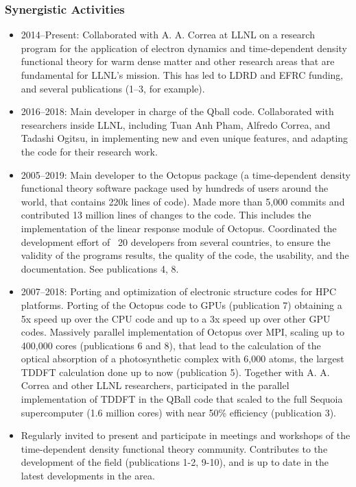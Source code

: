 \subsubsection*{Synergistic Activities}

\begin{itemize}
    \item 2014–Present: Collaborated with A. A. Correa at LLNL on a research program for the application of electron dynamics and time-dependent density functional theory for warm dense matter and other research areas that are fundamental for LLNL’s mission. This has led to LDRD and EFRC funding, and several publications (1--3, for example).
    \item 2016–2018: Main developer in charge of the Qball code. Collaborated with researchers inside LLNL, including Tuan Anh Pham, Alfredo Correa, and Tadashi Ogitsu, in implementing new and even unique features, and adapting the code for their research work. 
    \item 2005–2019: Main developer to the Octopus package (a time-dependent density functional theory software package used by hundreds of users around the world, that contains 220k lines of code). Made more than 5,000 commits and contributed 13 million lines of changes to the code. This includes the implementation of the linear response module of Octopus. Coordinated the development effort of ~20 developers from several countries, to ensure the validity of the programs results, the quality of the code, the usability, and the documentation. See publications 4, 8.
    \item 2007–2018: Porting and optimization of electronic structure codes for HPC platforms. Porting of the Octopus code to GPUs (publication 7) obtaining a 5x speed up over the CPU code and up to a 3x speed up over other GPU codes. Massively parallel implementation of Octopus over MPI, scaling up to 400,000 cores (publications 6 and 8), that lead to the calculation of the optical absorption of a photosynthetic complex with 6,000 atoms, the largest TDDFT calculation done up to now (publication 5). Together with A. A. Correa and other LLNL researchers, participated in the parallel implementation of TDDFT in the QBall code that scaled to the full Sequoia supercomputer (1.6 million cores) with near 50\% efficiency (publication 3).
    \item Regularly invited to present and participate in meetings and workshops of the time-dependent density functional theory community. Contributes to the development of the field (publications 1-2, 9-10), and is up to date in the latest developments in the area.
\end{itemize}
\clearpage

